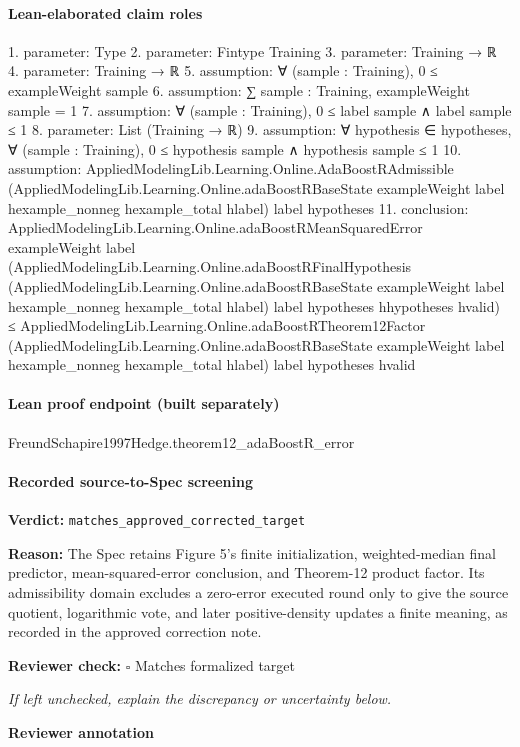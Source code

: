 \documentclass[10pt]{article}
\newcommand{\reviewerbox}{%
  \par\noindent\fbox{\parbox{0.96\linewidth}{\rule{0pt}{0.38in}}}\par
}
\newcommand{\reviewmatch}[1]{%
  \par\noindent\textbf{Reviewer check:} $\square$\; #1\par
  \noindent\emph{If left unchecked, explain the discrepancy or uncertainty below.}\par
}
\begin{document}
\paragraph{Lean-elaborated claim roles}\begin{ReviewVerbatim}
1. parameter: Type
2. parameter: Fintype Training
3. parameter: Training → ℝ
4. parameter: Training → ℝ
5. assumption: ∀ (sample : Training), 0 ≤ exampleWeight sample
6. assumption: ∑ sample : Training, exampleWeight sample = 1
7. assumption: ∀ (sample : Training), 0 ≤ label sample ∧ label sample ≤ 1
8. parameter: List (Training → ℝ)
9. assumption: ∀ hypothesis ∈ hypotheses, ∀ (sample : Training), 0 ≤ hypothesis sample ∧ hypothesis sample ≤ 1
10. assumption: AppliedModelingLib.Learning.Online.AdaBoostRAdmissible
  (AppliedModelingLib.Learning.Online.adaBoostRBaseState exampleWeight label hexample_nonneg hexample_total hlabel)
  label hypotheses
11. conclusion: AppliedModelingLib.Learning.Online.adaBoostRMeanSquaredError exampleWeight label
    (AppliedModelingLib.Learning.Online.adaBoostRFinalHypothesis
      (AppliedModelingLib.Learning.Online.adaBoostRBaseState exampleWeight label hexample_nonneg hexample_total hlabel)
      label hypotheses hhypotheses hvalid) ≤
  AppliedModelingLib.Learning.Online.adaBoostRTheorem12Factor
    (AppliedModelingLib.Learning.Online.adaBoostRBaseState exampleWeight label hexample_nonneg hexample_total hlabel)
    label hypotheses hvalid
\end{ReviewVerbatim}

\paragraph{Lean proof endpoint (built separately)}\begin{ReviewVerbatim}
FreundSchapire1997Hedge.theorem12_adaBoostR_error
\end{ReviewVerbatim}

\paragraph{Recorded source-to-Spec screening}
\textbf{Verdict:} \texttt{matches\_approved\_corrected\_target}
\\
{\raggedright
\textbf{Reason:} The Spec retains Figure 5's finite initialization, weighted-\allowbreak{}median final predictor, mean-\allowbreak{}squared-\allowbreak{}error conclusion, and Theorem-\allowbreak{}12 product factor.\allowbreak{} Its admissibility domain excludes a zero-\allowbreak{}error executed round only to give the source quotient, logarithmic vote, and later positive-\allowbreak{}density updates a finite meaning, as recorded in the approved correction note.\allowbreak{}
\par}
\reviewmatch{Matches formalized target}
\noindent\textbf{Reviewer annotation}\par
\reviewerbox
\end{document}
